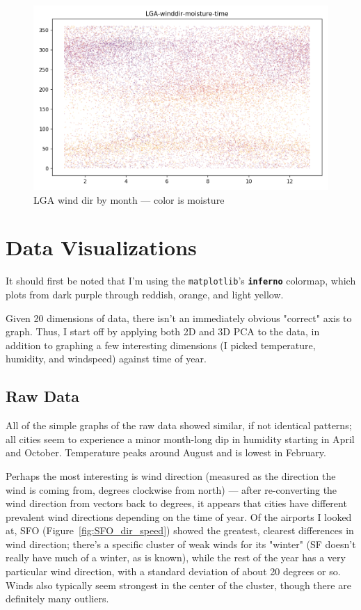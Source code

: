 \documentclass[a4paper]{article}
\begin{document}
\begin{figure}[t]
  \centering
  \includegraphics[width=\linewidth]{../png/basic-vis/LGA-winddir-moisture-time.png}
  \caption{LGA wind dir by month --- color is moisture}
  \label{fig:LGA_dir_moisture}
\end{figure}

\section{Data Visualizations}

It should first be noted that I'm using the \texttt{matplotlib}'s \texttt{\textbf{inferno}} colormap, which plots from dark purple through reddish, orange, and light yellow.

Given 20 dimensions of data, there isn't an immediately obvious "correct" axis to graph. Thus, I start off by applying both 2D and 3D PCA to the data, in addition to graphing a few interesting dimensions (I picked temperature, humidity, and windspeed) against time of year.

\subsection{Raw Data}
All of the simple graphs of the raw data showed similar, if not identical patterns; all cities seem to experience a minor month-long dip in humidity starting in April and October. Temperature peaks around August and is lowest in February. 

Perhaps the most interesting is wind direction (measured as the direction the wind is coming from, degrees clockwise from north) --- after re-converting the wind direction from vectors back to degrees, it appears that cities have different prevalent wind directions depending on the time of year. Of the airports I looked at, SFO (Figure~\ref{fig:SFO_dir_speed}) showed the greatest, clearest differences in wind direction; there's a specific cluster of weak winds for its "winter" (SF doesn't really have much of a winter, as is known), while the rest of the year has a very particular wind direction, with a standard deviation of about 20 degrees or so. Winds also typically seem strongest in the center of the cluster, though there are definitely many outliers. 
\end{document}
